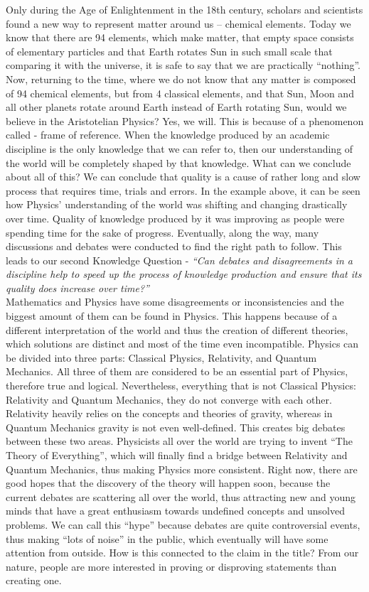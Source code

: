 \documentclass[12pt,a4paper]{article}
\begin{document}
Only during the Age of Enlightenment in the 18th century, scholars and scientists found a new way to represent matter around us – chemical elements. Today we know that there are 94 elements\cite{table}, which make matter, that empty space consists of elementary particles and that Earth rotates Sun in such small scale that comparing it with the universe, it is safe to say that we are practically ``nothing''. Now, returning to the time, where we do not know that any matter is composed of 94 chemical elements, but from 4 classical elements, and that Sun, Moon and all other planets rotate around Earth instead of Earth rotating Sun, would we believe in the Aristotelian Physics? Yes, we will. This is because of a phenomenon called - frame of reference. When the knowledge produced by an academic discipline is the only knowledge that we can refer to, then our understanding of the world will be completely shaped by that knowledge. What can we conclude about all of this? We can conclude that quality is a cause of rather long and slow process that requires time, trials and errors. In the example above, it can be seen how Physics’ understanding of the world was shifting and changing drastically over time. Quality of knowledge produced by it was improving as people were spending time for the sake of progress. Eventually, along the way, many discussions and debates were conducted to find the right path to follow. This leads to our second Knowledge Question - \textit{``Can debates and disagreements in a discipline help to speed up the process of knowledge production and ensure that its quality does increase over time?''}\\

Mathematics and Physics have some disagreements or inconsistencies and the biggest amount of them can be found in Physics. This happens because of a different interpretation of the world and thus the creation of different theories, which solutions are distinct and most of the time even incompatible. Physics can be divided into three parts: Classical Physics, Relativity, and Quantum Mechanics\cite{bop}. All three of them are considered to be an essential part of Physics, therefore true and logical. Nevertheless, everything that is not Classical Physics: Relativity and Quantum Mechanics, they do not converge with each other. Relativity heavily relies on the concepts and theories of gravity, whereas in Quantum Mechanics gravity is not even well-defined. This creates big debates between these two areas. Physicists all over the world are trying to invent “The Theory of Everything”\cite{toe}, which will finally find a bridge between Relativity and Quantum Mechanics, thus making Physics more consistent. Right now, there are good hopes that the discovery of the theory will happen soon, because the current debates are scattering all over the world, thus attracting new and young minds that have a great enthusiasm towards undefined concepts and unsolved problems. We can call this ``hype'' because debates are quite controversial events, thus making “lots of noise” in the public, which eventually will have some attention from outside. How is this connected to the claim in the title? From our nature, people are more interested in proving or disproving statements than creating one. \\
\end{document}

